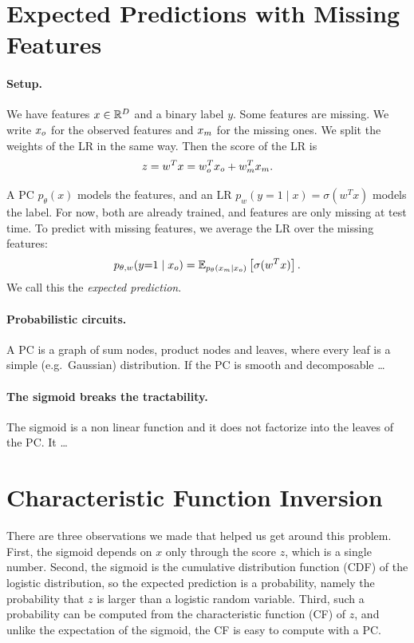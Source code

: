 \section{Expected Predictions with Missing Features}
\label{sec:setup}

\paragraph{Setup.}
We have features $x \in \mathbb{R}^D$ and a binary label $y$.
Some features are missing.
We write $x_o$ for the observed features and $x_m$ for the missing ones.
We split the weights of the LR in the same way.
Then the score of the LR is
\[
  z = w^T x = w_o^T x_o + w_m^T x_m.
\]

A PC $p_\theta(x)$ models the features, and an LR $p_w(y{=}1 \mid x) = \sigma(w^T x)$ models the label.
For now, both are already trained, and features are only missing at test time.
To predict with missing features, we average the LR over the missing features:
\begin{equation}
  p_{\theta, w}(y{=}1 \mid x_o) = \mathbb{E}_{p_\theta(x_m \mid x_o)} \left[ \sigma(w^T x) \right].
  \label{eq:goal}
\end{equation}
We call this the \emph{expected prediction}.

\paragraph{Probabilistic circuits.}
A PC is a graph of sum nodes, product nodes and leaves, where every leaf is a simple (e.g.\ Gaussian) distribution.
If the PC is smooth and decomposable \dots

\paragraph{The sigmoid breaks the tractability.}
The sigmoid is a non linear function and it does not factorize into the leaves of the PC. 
It \dots

\section{Characteristic Function Inversion}
\label{sec:cfi}

There are three observations we made that helped us get around this problem.
First, the sigmoid depends on $x$ only through the score $z$, which is a single number.
Second, the sigmoid is the cumulative distribution function (CDF) of the logistic distribution, so the expected prediction is a probability, namely the probability that $z$ is larger than a logistic random variable.
Third, such a probability can be computed from the characteristic function (CF) of $z$, and unlike the expectation of the sigmoid, the CF is easy to compute with a PC.

